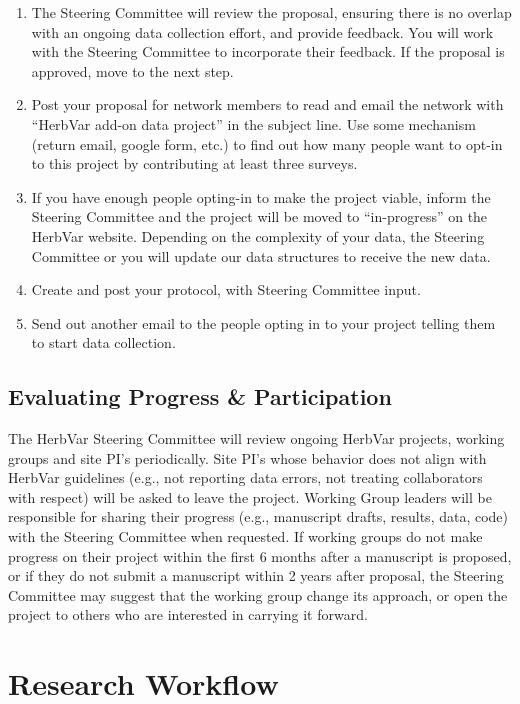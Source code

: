 \documentclass[
  letterpaper,
  oneside,
  open=any]{scrbook}
\begin{document}
\begin{enumerate}
\def\labelenumi{\arabic{enumi}.}
\setcounter{enumi}{2}
\item
  The Steering Committee will review the proposal, ensuring there is no
  overlap with an ongoing data collection effort, and provide feedback.
  You will work with the Steering Committee to incorporate their
  feedback. If the proposal is approved, move to the next step.
\item
  Post your proposal for network members to read and email the network
  with ``HerbVar add-on data project'' in the subject line. Use some
  mechanism (return email, google form, etc.) to find out how many
  people want to opt-in to this project by contributing at least three
  surveys.
\item
  If you have enough people opting-in to make the project viable, inform
  the Steering Committee and the project will be moved to
  ``in-progress'' on the HerbVar website. Depending on the complexity of
  your data, the Steering Committee or you will update our data
  structures to receive the new data.
\item
  Create and post your protocol, with Steering Committee input.
\item
  Send out another email to the people opting in to your project telling
  them to start data collection.
\end{enumerate}

\chapter{Evaluating Progress \& Participation}\label{sec-project_review}

The HerbVar Steering Committee will review ongoing HerbVar projects,
working groups and site PI's periodically. Site PI's whose behavior does
not align with HerbVar guidelines (e.g., not reporting data errors, not
treating collaborators with respect) will be asked to leave the project.
Working Group leaders will be responsible for sharing their progress
(e.g., manuscript drafts, results, data, code) with the Steering
Committee when requested. If working groups do not make progress on
their project within the first 6 months after a manuscript is proposed,
or if they do not submit a manuscript within 2 years after proposal, the
Steering Committee may suggest that the working group change its
approach, or open the project to others who are interested in carrying
it forward.

\part{Research Workflow}
\end{document}
